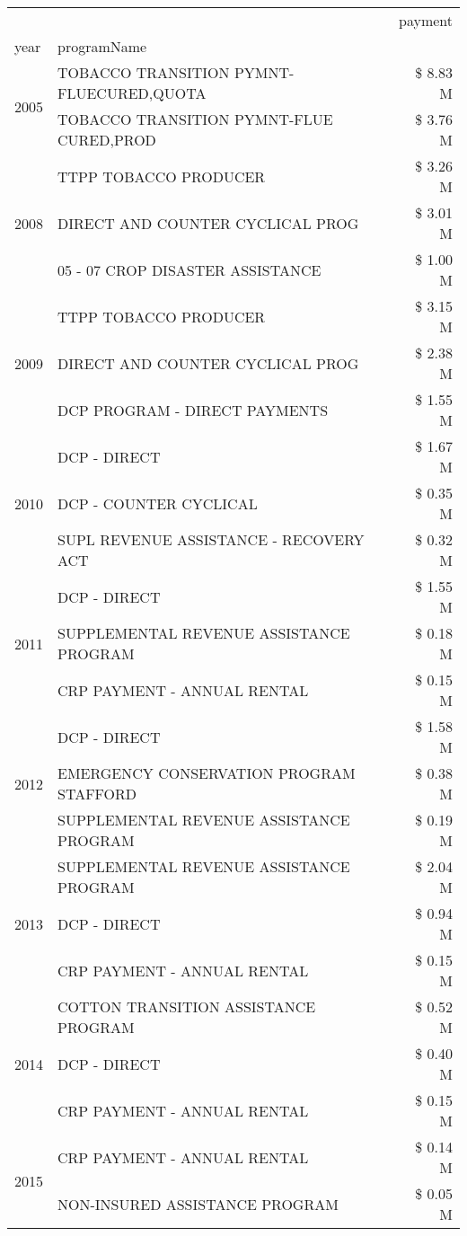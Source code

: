 \begin{tabular}{llr}
\toprule
 &  & payment \\
year & programName &  \\
\midrule
\multirow[t]{2}{*}{2005} & TOBACCO TRANSITION PYMNT-FLUECURED,QUOTA & \$ 8.83 M \\
 & TOBACCO TRANSITION PYMNT-FLUE CURED,PROD & \$ 3.76 M \\
\cline{1-3}
\multirow[t]{3}{*}{2008} & TTPP TOBACCO PRODUCER & \$ 3.26 M \\
 & DIRECT AND COUNTER CYCLICAL PROG & \$ 3.01 M \\
 & 05 - 07 CROP DISASTER ASSISTANCE & \$ 1.00 M \\
\cline{1-3}
\multirow[t]{3}{*}{2009} & TTPP TOBACCO PRODUCER & \$ 3.15 M \\
 & DIRECT AND COUNTER CYCLICAL PROG & \$ 2.38 M \\
 & DCP PROGRAM - DIRECT PAYMENTS & \$ 1.55 M \\
\cline{1-3}
\multirow[t]{3}{*}{2010} & DCP - DIRECT & \$ 1.67 M \\
 & DCP - COUNTER CYCLICAL & \$ 0.35 M \\
 & SUPL REVENUE ASSISTANCE - RECOVERY ACT & \$ 0.32 M \\
\cline{1-3}
\multirow[t]{3}{*}{2011} & DCP - DIRECT & \$ 1.55 M \\
 & SUPPLEMENTAL REVENUE ASSISTANCE PROGRAM & \$ 0.18 M \\
 & CRP PAYMENT - ANNUAL RENTAL & \$ 0.15 M \\
\cline{1-3}
\multirow[t]{3}{*}{2012} & DCP - DIRECT & \$ 1.58 M \\
 & EMERGENCY CONSERVATION PROGRAM STAFFORD & \$ 0.38 M \\
 & SUPPLEMENTAL REVENUE ASSISTANCE PROGRAM & \$ 0.19 M \\
\cline{1-3}
\multirow[t]{3}{*}{2013} & SUPPLEMENTAL REVENUE ASSISTANCE PROGRAM & \$ 2.04 M \\
 & DCP - DIRECT & \$ 0.94 M \\
 & CRP PAYMENT - ANNUAL RENTAL & \$ 0.15 M \\
\cline{1-3}
\multirow[t]{3}{*}{2014} & COTTON TRANSITION ASSISTANCE PROGRAM & \$ 0.52 M \\
 & DCP - DIRECT & \$ 0.40 M \\
 & CRP PAYMENT - ANNUAL RENTAL & \$ 0.15 M \\
\cline{1-3}
\multirow[t]{3}{*}{2015} & CRP PAYMENT - ANNUAL RENTAL & \$ 0.14 M \\
 & NON-INSURED ASSISTANCE PROGRAM & \$ 0.05 M \\

\end{tabular}
